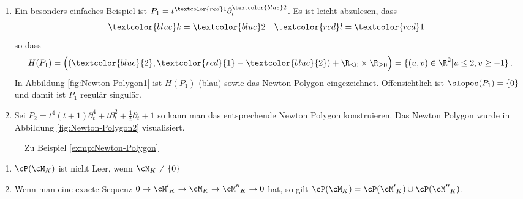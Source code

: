 \begin{exmp} \label{exmp:Newton-Polygon}
\begin{enumerate}
\item Ein besonders einfaches Beispiel ist
$P_1=t^{\textcolor{red}1}\partial_t^{\textcolor{blue}2}$.  Es ist leicht
abzulesen, dass
\begin{align*}
\textcolor{blue}k &= \textcolor{blue}2 &
\textcolor{red}l  &= \textcolor{red}1
\end{align*}
so dass
\[
H(P_1)=\Big( (\textcolor{blue}{2},\textcolor{red}{1}-\textcolor{blue}{2}) +
\R_{\leq 0}\times \R_{\geq 0} \Big) =\{(u,v)\in\R^2|u\leq 2, v\geq -1\} \,.
\]
In Abbildung \ref{fig:Newton-Polygon1} ist $H(P_1)$ (blau) sowie das Newton
Polygon eingezeichnet. Offensichtlich ist $\slopes(P_1)=\{0\}$ und damit ist
$P_1$ regulär singulär.
\item \cite[Bsp 5.3. 2.]{ZulaBarbara}
Sei $P_2=t^4(t+1)\partial_t^4+t\partial_t^2+\frac{1}{t}\partial_t+1$ so kann
man das entsprechende Newton Polygon konstruieren.
Das Newton Polygon wurde in Abbildung \ref{fig:Newton-Polygon2} visualisiert.
\end{enumerate}
\end{exmp}
\begin{figure}[H]
\label{fig:Newton-Polygon}
\caption{Zu Beispiel \ref{exmp:Newton-Polygon}}
\centering
\end{figure}

\begin{lem}
\cite[5.1]{sabbah_cimpa90} %
\begin{enumerate}
\item $\cP(\cM_K)$ ist nicht Leer, wenn $\cM_K\neq\{0\}$
\item Wenn man eine exacte Sequenz
$0\rightarrow{\cM'}_K\rightarrow{\cM}_K\rightarrow{\cM''}_K\rightarrow0$
hat, so gilt $\cP(\cM_K)=\cP({\cM'}_K)\cup\cP({\cM''}_K)$.
\end{enumerate}
\end{lem}

